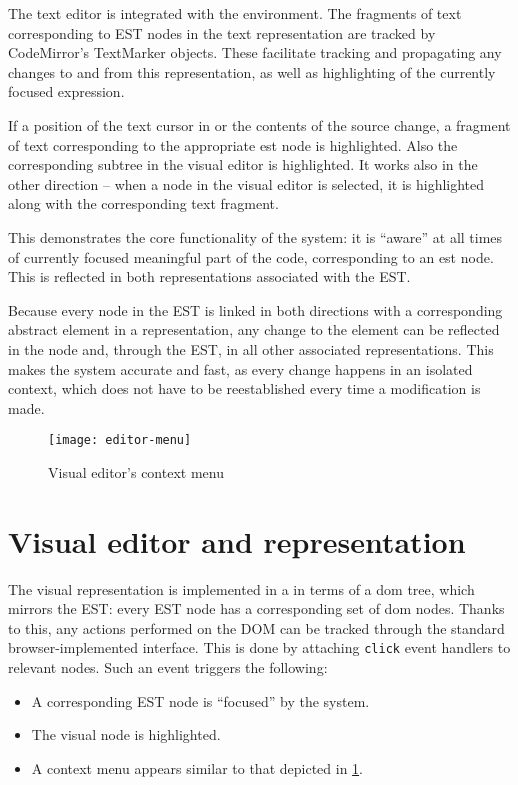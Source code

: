 The text editor is integrated with the environment. The fragments of text corresponding to EST nodes in the text representation are tracked by CodeMirror's TextMarker objects. These facilitate tracking and propagating any changes to and from this representation, as well as highlighting of the currently focused expression.
      
If a position of the text cursor in or the contents of the source change, a fragment of text corresponding to the appropriate \acrshort{est} node is highlighted. Also the corresponding subtree in the visual editor is highlighted. It works also in the other direction -- when a node in the visual editor is selected, it is highlighted along with the corresponding text fragment.

This demonstrates the core functionality of the system: it is ``aware'' at all times of currently focused meaningful part of the code, corresponding to an \acrshort{est} node. This is reflected in both representations associated with the EST.

Because every node in the EST is linked in both directions with a corresponding
abstract element in a representation, any change to the element can be reflected
in the node and, through the EST, in all other associated representations. This
makes the system accurate and fast, as every change happens in an isolated
context, which does not have to be reestablished every time a modification is
made.


\begin{figure}[h!]
\centering \texttt{[image: editor-menu]}
\caption{Visual editor's context menu}
\label{fig:editor-menu}
\end{figure}

\section{Visual editor and representation}
The visual representation is implemented in a in terms of a \acrshort{dom} tree, which mirrors the EST: every EST node has a corresponding set of \acrshort{dom} nodes. Thanks to this, any actions performed on the DOM can be tracked through the standard browser-implemented interface. This is done by
attaching \texttt{click} event handlers to relevant nodes. Such an event
triggers the following:
\begin{itemize}
    \item A corresponding EST node is ``focused'' by the system.
    \item The visual node is highlighted.
    \item A context menu appears similar to that depicted in
      \ref{fig:editor-menu}.
\end{itemize}

